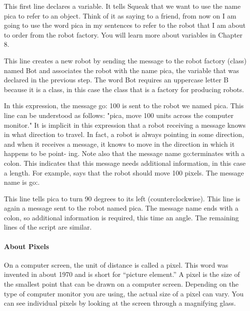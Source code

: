 \documentclass[a4paper,10pt,twoside]{book}
\begin{document}
\begin{description}
\item {} This first line declares a variable. It tells Squeak that we want to use the name 
pica to refer to an object. Think of it as saying to a friend, from now on I am going to use 
the word pica in my sentences to refer to the robot that I am about to order from the 
robot factory. You will learn more about variables in Chapter 8. 


\item {} This line creates a new robot by sending the message  to the robot factory (class) named Bot and associates the robot with the name pica, the variable that 
was declared in the previous step. The word Bot requires an uppercase letter B because it 
is a class, in this case the class that is a factory for producing robots. 

\item {} In this expression, the message go: 100 is sent to the robot we named 
pica. This line can be understood as follows: "pica, move 100 units across the computer 
monitor." It is implicit in this expression that a robot receiving a  message knows in 
what direction to travel. In fact, a robot is always pointing in some direction, and when it 
receives a  message, it knows to move in the direction in which it happens to be point- 
ing. Note also that the message name go:terminates with a colon. This indicates that this 
message needs additional information, in this case a length. For example,  says 
that the robot should move 100 pixels. The message name is go:. 

\item {} This line tells pica to turn 90 degrees to its left (counterclockwise). 
This line is again a message sent to the robot named pica. The message name 
ends with a colon, so additional information is required, this time an angle. 
The remaining lines of the script are similar. 

\end{description}


\paragraph{About Pixels}
On a computer screen, the unit of distance is called a pixel. This word was invented in about 
1970 and is short for “picture element.” A pixel is the size of the smallest point that can be 
drawn on a computer screen. Depending on the type of computer monitor you are using, the 
actual size of a pixel can vary. You can see individual pixels by looking at the screen through a 
magnifying glass. 
\end{document}
